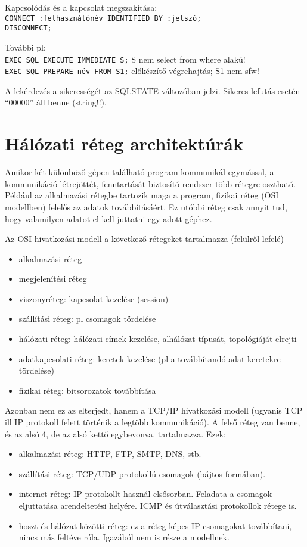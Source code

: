 \documentclass[fleqn,10pt,a4paper]{article}
\theoremstyle{magyar}
\begin{document}
  Kapcsolódás és a kapcsolat megszakítása:\\
  \texttt{CONNECT :felhasználónév IDENTIFIED BY :jelszó;\\
    DISCONNECT;}
  
  További pl:\\
  \texttt{EXEC SQL EXECUTE IMMEDIATE S;} S nem select from where alakú!\\
  \texttt{EXEC SQL PREPARE név FROM S1;} előkészítő végrehajtás; S1 nem sfw!
  
  A lekérdezés a sikerességét az SQLSTATE változóban jelzi. Sikeres lefutás esetén ``00000'' áll benne (string!!).
  

  

  \newpage
  \section{Hálózati réteg architektúrák}
  
  Amikor két különböző gépen található program kommunikál egymással, a kommunikáció létrejöttét, fenntartását biztosító
  rendszer több rétegre osztható. Például az alkalmazási rétegbe tartozik maga a program, fizikai réteg (OSI modellben)
  felelős az adatok továbbításáért. Ez utóbbi réteg csak annyit tud, hogy valamilyen adatot el kell juttatni egy adott
  géphez.

  Az OSI hivatkozási modell a következő rétegeket tartalmazza (felülről lefelé)
  \begin{itemize}
  \item alkalmazási réteg
  \item megjelenítési réteg
  \item viszonyréteg: kapcsolat kezelése (session)
  \item szállítási réteg: pl csomagok tördelése
  \item hálózati réteg: hálózati címek kezelése, alhálózat típusát, topológiáját elrejti
  \item adatkapcsolati réteg: keretek kezelése (pl a továbbítandó adat keretekre tördelése)
  \item fizikai réteg: bitsorozatok továbbítása
  \end{itemize}
  
  Azonban nem ez az elterjedt, hanem a TCP/IP hivatkozási modell (ugyanis TCP ill IP protokoll felett történik a legtöbb
  kommunikáció). A felső réteg van benne, és az alsó 4, de az alsó kettő egybevonva.
  tartalmazza. Ezek:
  \begin{itemize}
  \item alkalmazási réteg: HTTP, FTP, SMTP, DNS, stb.
  \item szállítási réteg: TCP/UDP protokollú csomagok (bájtos formában).
  \item internet réteg: IP protokollt használ elsősorban. Feladata a csomagok eljuttatása arendeltetési helyére. ICMP
    és útválasztási protokollok rétege is. 
  \item hoszt és hálózat közötti réteg: ez a réteg képes IP csomagokat továbbítani, nincs más feltéve róla. Igazából nem is
    része a modellnek.
  \end{itemize}
  
\end{document}
